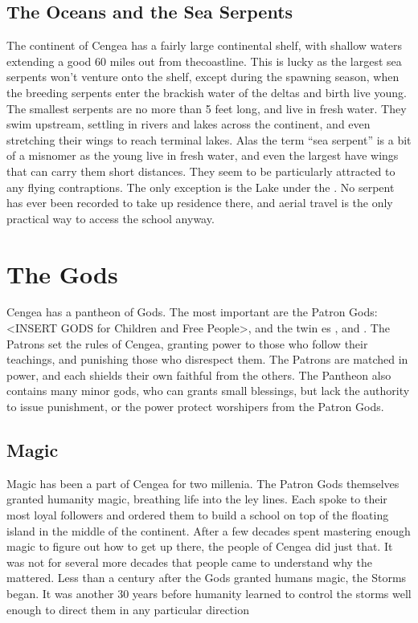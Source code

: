 \documentclass[blue]{GL2020}
\begin{document}
\subsection*{The Oceans and the Sea Serpents}
The continent of Cengea has a fairly large continental shelf, with shallow waters extending a good 60 miles out from thecoastline. This is lucky as the largest sea serpents won't venture onto the shelf, except during the spawning season, when the breeding serpents enter the brackish water of the deltas and birth live young. The smallest serpents are no more than 5 feet long, and live in fresh water. They swim upstream, settling in rivers and lakes across the continent, and even stretching their wings to reach terminal lakes. Alas the term ``sea serpent'' is a bit of a misnomer as the young live in fresh water, and even the largest have wings that can carry them short distances. They seem to be particularly attracted to any flying contraptions. The only exception is the Lake under the \pSchool{}. No serpent has ever been recorded to take up residence there, and aerial travel is the only practical way to access the school anyway.

\section*{The Gods}
Cengea has a pantheon of Gods. The most important are the Patron Gods: <INSERT GODS for Children and Free People>, and the twin \cEbb{\God}es \cEbbFull{}, and \cFlowFull{}. The Patrons set the rules of Cengea, granting power to those who follow their teachings, and punishing those who disrespect them. The Patrons are matched in power, and each shields their own faithful from the others. The Pantheon also contains many minor gods, who can grants small blessings, but lack the authority to issue punishment, or the power protect worshipers from the Patron Gods.

\subsection*{Magic}
Magic has been a part of Cengea for two millenia. The Patron Gods themselves granted humanity magic, breathing life into the ley lines. Each spoke to their most loyal followers and ordered them to build a school on top of the floating island in the middle of the continent. After a few decades spent mastering enough magic to figure out how to get up there, the people of Cengea did just that. It was not for several more decades that people came to understand why the \pSc{} mattered. Less than a century after the Gods granted humans magic, the Storms began. It was another 30 years before humanity learned to control the storms well enough to direct them in any particular direction
\end{document}
